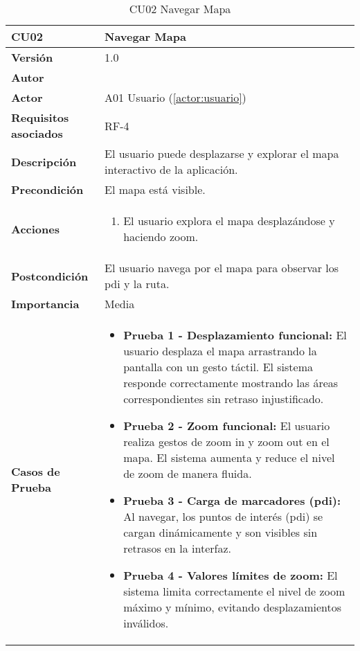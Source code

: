 \begin{table}[H]
	\centering
	\begin{tabularx}{\linewidth}{ p{} p{} }
		\toprule
		\textbf{CU02}    & \textbf{Navegar Mapa} \\
		\toprule
		\textbf{Versión}              & 1.0    \\
		\textbf{Autor}                & \autor \\
		\textbf{Actor}                & A01 Usuario (\ref{actor:usuario}) \\
		\textbf{Requisitos asociados} & RF-4 \\
		\textbf{Descripción}          & El usuario puede desplazarse y explorar el mapa interactivo de la aplicación. \\
		\textbf{Precondición}         & El mapa está visible. \\
		\textbf{Acciones}             &
		\begin{enumerate}
			\def\labelenumi{\arabic{enumi}.}
			\tightlist
			\item El usuario explora el mapa desplazándose y haciendo zoom.
		\end{enumerate}\\
		\textbf{Postcondición}        & El usuario navega por el mapa para observar los \acrshort{pdi} y la ruta. \\
		\textbf{Importancia}          & Media \\
		\textbf{Casos de Prueba}      &
		\begin{itemize}
			\item \textbf{Prueba 1 - Desplazamiento funcional:} El usuario desplaza el mapa arrastrando la pantalla con un gesto táctil. El sistema responde correctamente mostrando las áreas correspondientes sin retraso injustificado.
			\vspace{2pt}
			\item \textbf{Prueba 2 - Zoom funcional:} El usuario realiza gestos de zoom in y zoom out en el mapa. El sistema aumenta y reduce el nivel de zoom de manera fluida.
			\vspace{2pt}
			\item \textbf{Prueba 3 - Carga de marcadores (\acrshort{pdi}):} Al navegar, los puntos de interés (\acrshort{pdi}) se cargan dinámicamente y son visibles sin retrasos en la interfaz.
			\vspace{2pt}
			\item \textbf{Prueba 4 - Valores límites de zoom:} El sistema limita correctamente el nivel de zoom máximo y mínimo, evitando desplazamientos inválidos.
		\end{itemize} \\
		\bottomrule
	\end{tabularx}
	\caption{CU02 Navegar Mapa}
	\label{cu:navegar-mapa}
\end{table}



